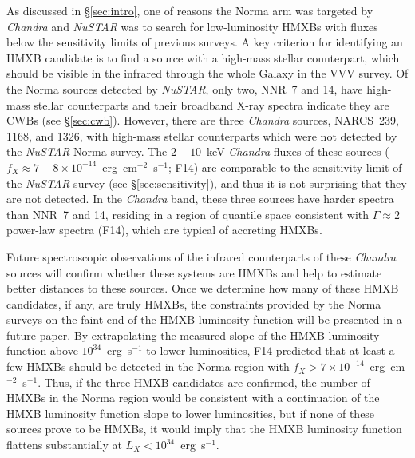 \documentclass[iop,revtex4]{emulateapj}
\begin{document}
As discussed in \S\ref{sec:intro}, one of reasons the Norma arm was targeted by \textit{Chandra} and \textit{NuSTAR} was to search for low-luminosity HMXBs with fluxes below the sensitivity limits of previous surveys.  A key criterion for identifying an HMXB candidate is to find a source with a high-mass stellar counterpart, which should be visible in the infrared through the whole Galaxy in the VVV survey.  Of the Norma sources detected by \textit{NuSTAR}, only two, NNR~7 and 14, have high-mass stellar counterparts and their broadband X-ray spectra indicate they are CWBs (see \S\ref{sec:cwb}).  However, there are three \textit{Chandra} sources, NARCS~239, 1168, and 1326, with high-mass stellar counterparts \citep{rahoui14} which were not detected by the \textit{NuSTAR} Norma survey.  The $2-10$~keV \textit{Chandra} fluxes of these sources ($f_X\approx7-8\times10^{-14}$~erg~cm$^{-2}$~s$^{-1}$; F14) are comparable to the sensitivity limit of the \textit{NuSTAR} survey (see \S\ref{sec:sensitivity}), and thus it is not surprising that they are not detected.  In the \textit{Chandra} band, these three sources have harder spectra than NNR~7 and 14, residing in a region of quantile space consistent with $\Gamma\approx2$ power-law spectra (F14), which are typical of accreting HMXBs.  \par
Future spectroscopic observations of the infrared counterparts of these \textit{Chandra} sources will confirm whether these systems are HMXBs and help to estimate better distances to these sources.  Once we determine how many of these HMXB candidates, if any, are truly HMXBs, the constraints provided by the Norma surveys on the faint end of the HMXB luminosity function will be presented in a future paper.  By extrapolating the measured slope of the HMXB luminosity function above $10^{34}$~erg~s$^{-1}$ to lower luminosities, F14 predicted that at least a few HMXBs should be detected in the Norma region with $f_X>7\times10^{-14}$~erg~cm$^{-2}$~s$^{-1}$.  Thus, if the three HMXB candidates are confirmed, the number of HMXBs in the Norma region would be consistent with a continuation of the HMXB luminosity function slope to lower luminosities, but if none of these sources prove to be HMXBs, it would imply that the HMXB luminosity function flattens substantially at $L_X<10^{34}$~erg~s$^{-1}$.  
\end{document}
